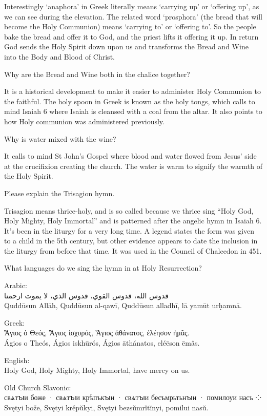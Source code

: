 \documentclass[
]{article}
\newcommand{\RL}[1]{\beginR #1\endR}
\begin{document}
Interestingly `anaphora' in Greek literally means `carrying up' or
`offering up', as we can see during the elevation. The related word
`prosphora' (the bread that will become the Holy Communion) means
`carrying to' or `offering to'. So the people bake the bread and offer
it to God, and the priest lifts it offering it up. In return God sends
the Holy Spirit down upon us and transforms the Bread and Wine into the
Body and Blood of Christ.

Why are the Bread and Wine both in the chalice together?

It is a historical development to make it easier to administer Holy
Communion to the faithful. The holy spoon in Greek is known as the holy
tongs, which calls to mind Isaiah 6 where Isaiah is cleansed with a coal
from the altar. It also points to how Holy communion was administered
previously.

Why is water mixed with the wine?

It calls to mind St John's Gospel where blood and water flowed from
Jesus' side at the crucifixion creating the church. The water is warm to
signify the warmth of the Holy Spirit.

Please explain the Trisagion hymn.

Trisagion means thrice-holy, and is so called because we thrice sing
``Holy God, Holy Mighty, Holy Immortal'' and is patterned after the
angelic hymn in Isaiah 6. It's been in the liturgy for a very long time.
A legend states the form was given to a child in the 5th century, but
other evidence appears to date the inclusion in the liturgy from before
that time. It was used in the Council of Chalcedon in 451.

What languages do we sing the hymn in at Holy Resurrection?

Arabic:\\
\RL{قدوس} \RL{الله،} \RL{قدوس} \RL{القوي،} \RL{قدوس} \RL{الذي،} \RL{لا}
\RL{يموت} \RL{ارحمنا}\\
Quddūsun Allāh, Quddūsun al-qawī, Quddūsun alladhī, lā yamūt urḥamnā.

Greek:\\
Ἅγιος ὁ Θεός, Ἅγιος ἰσχυρός, Ἅγιος ἀθάνατος, ἐλέησον ἡμᾶς.\\
Ágios o Theós, Ágios iskhūrós, Ágios āthánatos, eléēson ēmâs.

English:\\
Holy God, Holy Mighty, Holy Immortal, have mercy on us.

Old Church Slavonic:\\
свѧтꙑи боже · свѧтꙑи крѣпъкꙑи · свѧтꙑи бесъмрьтьнꙑи · помилоуи насъ ⁘\\
Svętyi bože, Svętyi krěpŭkyi, Svętyi bezsŭmrĭtĭnyi, pomilui nasŭ.
\end{document}
